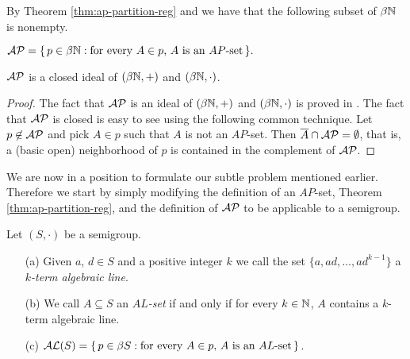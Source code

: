 By Theorem \ref{thm:ap-partition-reg} and \cite[Theorem 3.11]{Hindman:1998fk} we have that the following subset of $\beta \mathbb{N}$ is nonempty.

\begin{defn}
  $\mathcal{AP} = \{\, p \in \beta \mathbb{N} : \mbox{for every $A \in p$, $A$ is an $AP$-set} \,\}.$
\end{defn}

\begin{thm}
  $\mathcal{AP}$ is a closed ideal of $(\beta \mathbb{N}, +)$ and $(\beta \mathbb{N}, \cdot)$.
\end{thm}
\begin{proof}
  The fact that $\mathcal{AP}$ is an ideal of $(\beta \mathbb{N}, +)$ and $(\beta \mathbb{N}, \cdot)$ is proved in \cite[Theorem 14.5]{Hindman:1998fk}. 
  The fact that $\mathcal{AP}$ is closed is easy to see using the following common technique.
  Let $p \not\in \mathcal{AP}$ and pick $A \in p$ such that $A$ is not an $AP$-set.
  Then $\overline{A} \cap \mathcal{AP} = \emptyset$, that is, a (basic open) neighborhood of $p$ is contained in the complement of $\mathcal{AP}$.
\end{proof}

We are now in a position to formulate our subtle problem mentioned earlier.
Therefore we start by simply modifying the definition of an $AP$-set, Theorem \ref{thm:ap-partition-reg}, and the definition of $\mathcal{AP}$ to be applicable to a semigroup.

\begin{defn}
  Let $(S, \cdot)$ be a semigroup.
  \begin{itemize}
    \item[(a)] Given $a$, $d \in S$ and a positive integer $k$ we call the set $\{a, ad, \ldots, ad^{k-1}\}$ a \emph{$k$-term algebraic line}. 

    \item[(b)] We call $A \subseteq S$ an \emph{$AL$-set} if and only if for every $k \in \mathbb{N}$, $A$ contains a $k$-term algebraic line.

    \item[(c)] $\mathcal{AL}(S) = \{\, p \in \beta S : \mbox{for every $A \in p$, $A$ is an $AL$-set} \,\}$.
  \end{itemize}
\end{defn}

